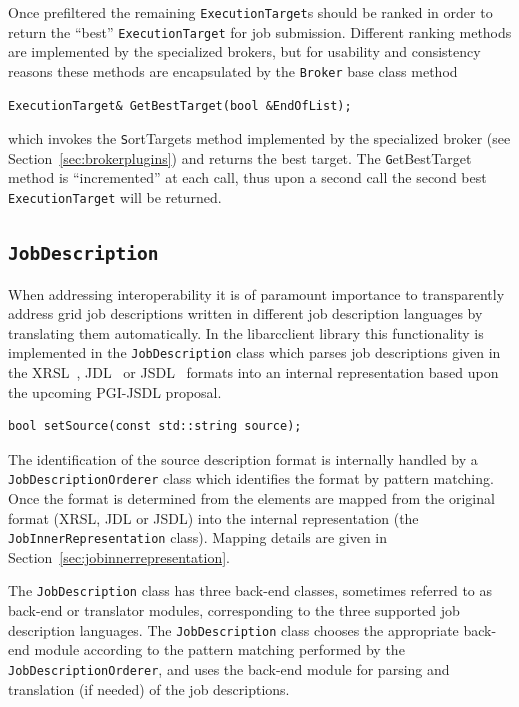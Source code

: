 \documentclass{book}
\newcommand{\libarcclient}{libarcclient}
\newcommand{\Broker}{\texttt{Broker}}
\newcommand{\ExecutionTarget}{\texttt{ExecutionTarget}}
\newcommand{\JobDescription}{\texttt{JobDescription}}
\begin{document}
Once prefiltered the remaining {\ExecutionTarget}s should be ranked in order to return the ``best'' {\ExecutionTarget} for 
job submission. Different ranking methods are implemented by the specialized brokers, but for usability and consistency reasons 
these methods are encapsulated by the {\Broker} base class method

\begin{shaded}
\begin{verbatim}
ExecutionTarget& GetBestTarget(bool &EndOfList);
\end{verbatim}
\end{shaded}

which invokes the {\texttt SortTargets} method implemented by the specialized broker (see Section~\ref{sec:brokerplugins}) 
and returns the best target. The {\texttt GetBestTarget} method is ``incremented'' at each call, thus upon a second call 
the second best {\ExecutionTarget} will be returned. 

\subsection{{\JobDescription}}

When addressing interoperability it is of paramount importance to
transparently address grid job descriptions written in different job
description languages by translating them automatically. In the
{\libarcclient} library this functionality is implemented in the
{\JobDescription} class which parses job descriptions given in the 
XRSL~\cite{xrsl}, JDL~\cite{jdl} or JSDL~\cite{jsdl} formats into an 
internal representation based upon the upcoming PGI-JSDL proposal. 

\begin{shaded}
\begin{verbatim}
bool setSource(const std::string source);
\end{verbatim}
\end{shaded}

The identification of the source description format is internally handled by a 
\texttt{JobDescriptionOrderer} class which identifies the format by pattern matching.
Once the format is determined from the elements are mapped from the original format (XRSL, JDL or JSDL) 
into the internal representation (the \texttt{JobInnerRepresentation} class). Mapping details 
are given in Section~\ref{sec:jobinnerrepresentation}. 

The {\JobDescription} class has three back-end classes, sometimes
referred to as back-end or translator modules, corresponding to the
three supported job description languages. The {\JobDescription} class
chooses the appropriate back-end module according to the pattern matching
performed by the \texttt{JobDescriptionOrderer}, and uses the back-end
module for parsing and translation (if needed) of the job descriptions.
\end{document}
